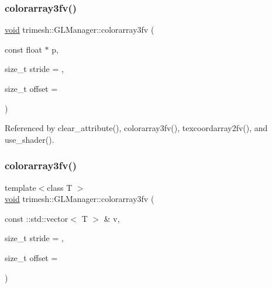\mbox{\label{classtrimesh_1_1GLManager_ab63b2ecadb2b573ff8f23a75350635df}} 
\subsubsection{\texorpdfstring{colorarray3fv()}{colorarray3fv()}\hspace{0.1cm}{\footnotesize\ttfamily [1/3]}}
{\footnotesize\ttfamily \hyperlink{namespacetrimesh_a784ddfd979e1c579bda795a8edfc3f43}{void} trimesh\+::\+G\+L\+Manager\+::colorarray3fv (\begin{DoxyParamCaption}\item[{const float $\ast$}]{p,  }\item[{size\+\_\+t}]{stride = {},  }\item[{size\+\_\+t}]{offset = {} }\end{DoxyParamCaption})}



Referenced by clear\+\_\+attribute(), colorarray3fv(), texcoordarray2fv(), and use\+\_\+shader().

\mbox{\label{classtrimesh_1_1GLManager_a9ece72924cbc94c5b649dcdac1bb2f29}} 
\subsubsection{\texorpdfstring{colorarray3fv()}{colorarray3fv()}\hspace{0.1cm}{\footnotesize\ttfamily [2/3]}}
{\footnotesize\ttfamily template$<$class T $>$ \\
\hyperlink{namespacetrimesh_a784ddfd979e1c579bda795a8edfc3f43}{void} trimesh\+::\+G\+L\+Manager\+::colorarray3fv (\begin{DoxyParamCaption}\item[{const \+::std\+::vector$<$ T $>$ \&}]{v,  }\item[{size\+\_\+t}]{stride = {},  }\item[{size\+\_\+t}]{offset = {} }\end{DoxyParamCaption})\hspace{0.3cm}{\ttfamily [inline]}}

